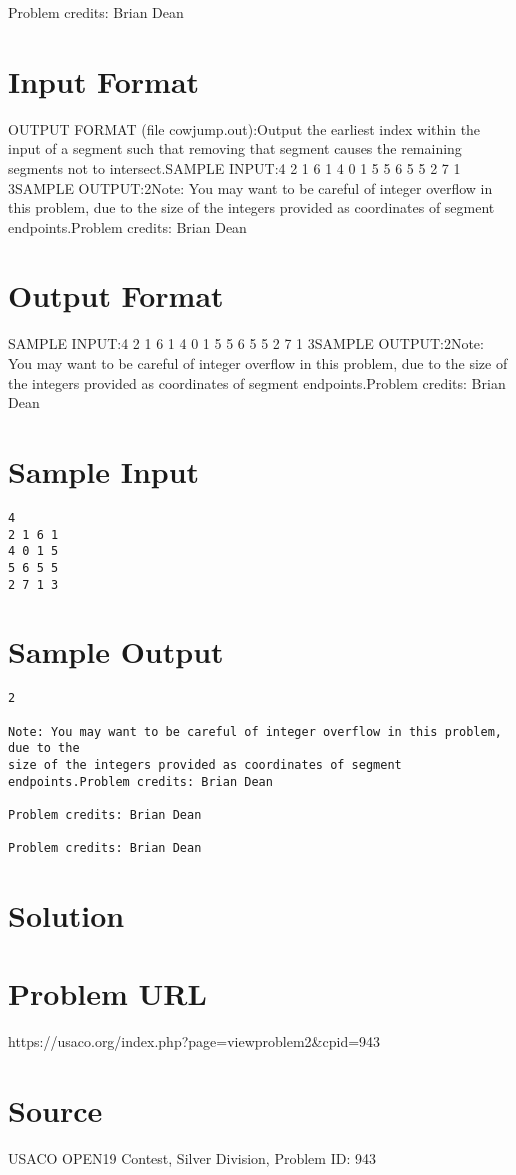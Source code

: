 \documentclass[12pt]{article}
\begin{document}
Problem credits: Brian Dean



\section*{Input Format}
OUTPUT FORMAT (file cowjump.out):Output the earliest index within the input of a segment such that removing that
segment causes the remaining segments not to intersect.SAMPLE INPUT:4
2 1 6 1
4 0 1 5
5 6 5 5
2 7 1 3SAMPLE OUTPUT:2Note: You may want to be careful of integer overflow in this problem, due to the
size of the integers provided as coordinates of segment endpoints.Problem credits: Brian Dean

\section*{Output Format}
SAMPLE INPUT:4
2 1 6 1
4 0 1 5
5 6 5 5
2 7 1 3SAMPLE OUTPUT:2Note: You may want to be careful of integer overflow in this problem, due to the
size of the integers provided as coordinates of segment endpoints.Problem credits: Brian Dean

\section*{Sample Input}
\begin{verbatim}
4
2 1 6 1
4 0 1 5
5 6 5 5
2 7 1 3
\end{verbatim}

\section*{Sample Output}
\begin{verbatim}
2

Note: You may want to be careful of integer overflow in this problem, due to the
size of the integers provided as coordinates of segment endpoints.Problem credits: Brian Dean

Problem credits: Brian Dean

Problem credits: Brian Dean
\end{verbatim}

\section*{Solution}


\section*{Problem URL}
https://usaco.org/index.php?page=viewproblem2&cpid=943

\section*{Source}
USACO OPEN19 Contest, Silver Division, Problem ID: 943
\end{document}
